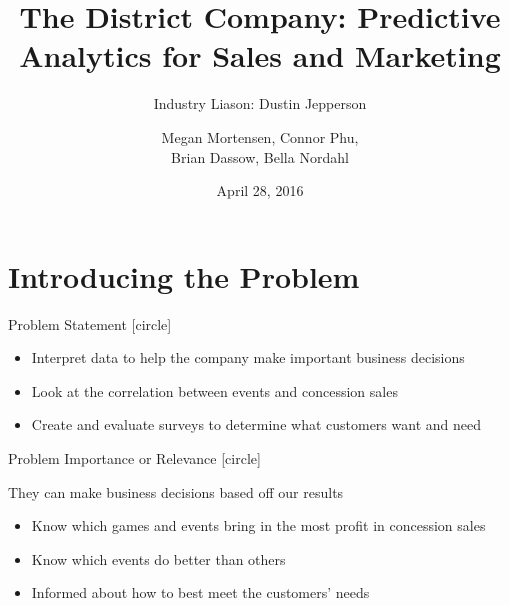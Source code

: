\documentclass[compress,blue]{beamer}
\title{The District Company: Predictive Analytics for Sales and Marketing}
\subtitle{Industry Liason: Dustin Jepperson}
\author{Megan Mortensen, Connor Phu, \\
Brian Dassow, Bella Nordahl}
\institute{\textbf{University of Wisconsin Stout} \\
}
\date{April 28, 2016}
\begin{document}
\frame{\titlepage}




\section{Introducing the Problem}

\begin{frame}{Problem Statement}
[circle]
\begin{itemize}
	\item Interpret data to help the company make important business decisions
	\item Look at the correlation between events and concession sales
	\item Create and evaluate surveys to determine what customers want and need
\end{itemize}
\end{frame}

\begin{frame}{Problem Importance or Relevance}
[circle]
	\item They can make business decisions based off our results
	\begin{itemize}
	  \item Know which games and events bring in the most profit in concession
	  sales
	  \item Know which events do better than others
	  \item Informed about how to best meet the customers' needs
	\end{itemize}
\end{frame}
\end{document}
